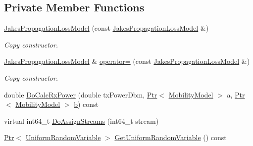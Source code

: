 \subsection*{Private Member Functions}
\begin{DoxyCompactItemize}
\item 
\hyperlink{classns3_1_1JakesPropagationLossModel_a08adfb0c03e74fdcf70a222b739db0d5}{Jakes\+Propagation\+Loss\+Model} (const \hyperlink{classns3_1_1JakesPropagationLossModel}{Jakes\+Propagation\+Loss\+Model} \&)
\begin{DoxyCompactList}\small\item\em Copy constructor. \end{DoxyCompactList}\item 
\hyperlink{classns3_1_1JakesPropagationLossModel}{Jakes\+Propagation\+Loss\+Model} \& \hyperlink{classns3_1_1JakesPropagationLossModel_a8446c4ec51fa28bb316cd91f6ffdf8b9}{operator=} (const \hyperlink{classns3_1_1JakesPropagationLossModel}{Jakes\+Propagation\+Loss\+Model} \&)
\begin{DoxyCompactList}\small\item\em Copy constructor. \end{DoxyCompactList}\item 
double \hyperlink{classns3_1_1JakesPropagationLossModel_aa8afac13faa2d8283dfcf32aa3c28dd1}{Do\+Calc\+Rx\+Power} (double tx\+Power\+Dbm, \hyperlink{classns3_1_1Ptr}{Ptr}$<$ \hyperlink{classns3_1_1MobilityModel}{Mobility\+Model} $>$ a, \hyperlink{classns3_1_1Ptr}{Ptr}$<$ \hyperlink{classns3_1_1MobilityModel}{Mobility\+Model} $>$ \hyperlink{lte__pathloss_8m_a21ad0bd836b90d08f4cf640b4c298e7c}{b}) const 
\item 
virtual int64\+\_\+t \hyperlink{classns3_1_1JakesPropagationLossModel_a1480a34382db30e4df3a40ab64755c0e}{Do\+Assign\+Streams} (int64\+\_\+t stream)
\item 
\hyperlink{classns3_1_1Ptr}{Ptr}$<$ \hyperlink{classns3_1_1UniformRandomVariable}{Uniform\+Random\+Variable} $>$ \hyperlink{classns3_1_1JakesPropagationLossModel_acced23ba7f1e919a0e5dfb05f8f7f1ac}{Get\+Uniform\+Random\+Variable} () const 
\end{DoxyCompactItemize}
